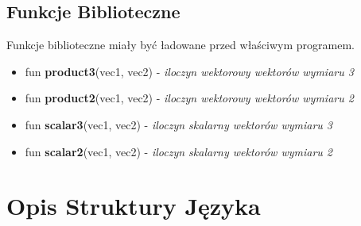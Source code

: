\documentclass[11pt]{article} %
\begin{document}
\subsection{Funkcje Biblioteczne}
Funkcje biblioteczne miały być ładowane przed właściwym programem.
\begin{itemize}
	\item fun \textbf{product3}(vec1, vec2) - \textit{iloczyn wektorowy wektorów wymiaru 3}
	\item fun \textbf{product2}(vec1, vec2) - \textit{iloczyn wektorowy wektorów wymiaru 2}
	\item fun \textbf{scalar3}(vec1, vec2) - \textit{iloczyn skalarny wektorów wymiaru 3}
	\item fun \textbf{scalar2}(vec1, vec2) - \textit{iloczyn skalarny wektorów wymiaru 2}
\end{itemize}

\section{Opis Struktury Języka}
\end{document}
